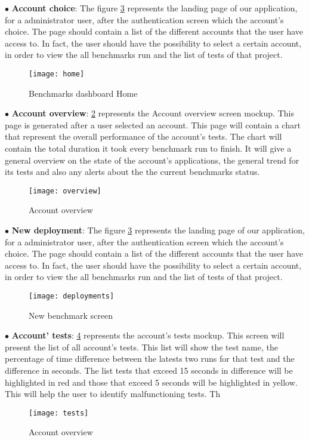 $\bullet$ \textbf{Account choice}:
The figure
\hyperref[fig:benchmarks_dashboard_home]{\ref{fig:benchmarks_dashboard_home}}
represents the landing page of our application, for a administrator user,
after the authentication screen which the account's choice. The page should
contain a list of the different accounts that the user have access to. In fact,
the user should have the possibility to select a certain account, in order to
view the all benchmarks run and the list of tests of that project.

\begin{figure}[h]
\texttt{[image: home]}
\caption{Benchmarks dashboard Home}
\label{fig:benchmarks_dashboard_home}
\end{figure}

$\bullet$ \textbf{Account overview}:
\hyperref[fig:benchmarks_dashboard_overview]{\ref{fig:benchmarks_dashboard_overview}}
represents the Account overview screen mockup. This page is generated after a
user selected an account. This page will contain a chart that represent the
overall performance of the account's tests. The chart will contain the total
duration it took every benchmark run to finish. It will give a general overview
on the state of the account's applications, the general trend for its tests and
also any alerts about the the current benchmarks status.

\begin{figure}[h]
\texttt{[image: overview]}
\caption{Account overview}
\label{fig:benchmarks_dashboard_overview}
\end{figure}

$\bullet$ \textbf{New deployment}:
The figure
\hyperref[fig:benchmarks_dashboard_home]{\ref{fig:benchmarks_dashboard_home}}
represents the landing page of our application, for a administrator user,
after the authentication screen which the account's choice. The page should
contain a list of the different accounts that the user have access to. In fact,
the user should have the possibility to select a certain account, in order to
view the all benchmarks run and the list of tests of that project.

\begin{figure}[h]
  \texttt{[image: deployments]}
  \caption{New benchmark screen}
\label{fig:benchmarks_dashboard_home}
\end{figure}

$\bullet$ \textbf{Account' tests}:
\hyperref[fig:benchmarks_dashboard_tests]{\ref{fig:benchmarks_dashboard_tests}}
represents the account's tests mockup. This screen will present the list of all
account's tests. This list will show the test name, the percentage of time
difference between the latests two runs for that test and the difference in
seconds. The list tests that exceed 15 seconds in difference will be highlighted
in red and those that exceed 5 seconds will be highlighted in yellow. This will
help the user to identify malfunctioning tests. Th

\begin{figure}[h]
\texttt{[image: tests]}
\caption{Account overview}
\label{fig:benchmarks_dashboard_tests}
\end{figure}


